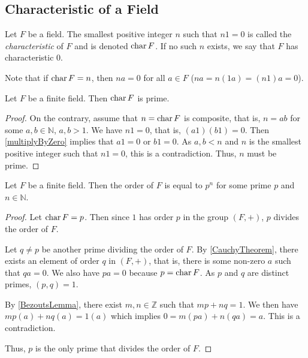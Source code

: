 \subsection{Characteristic of a Field}

\begin{definition}
    Let $F$ be a field. The smallest positive integer $n$ such that $n1=0$ is called the \textit{characteristic} of $F$ and is denoted $\operatorname{char} F$. If no such $n$ exists, we say that $F$ has characteristic $0$.
\end{definition}

Note that if $\operatorname{char} F=n$, then $na=0$ for all $a\in F$ ($na=n(1a)=(n1)a=0$).

\begin{theorem}
    Let $F$ be a finite field. Then $\operatorname{char} F$ is prime.
\end{theorem}
\begin{proof}
    On the contrary, assume that $n=\operatorname{char} F$ is composite, that is, $n=ab$ for some $a,b\in\mathbb{N}$, $a,b>1$. We have $n1=0$, that is, $(a1)(b1)=0$. Then \ref{multiplyByZero} implies that $a1=0$ or $b1=0$. As $a,b<n$ and $n$ is the smallest positive integer such that $n1=0$, this is a contradiction. Thus, $n$ must be prime.
\end{proof}

\begin{theorem}
    Let $F$ be a finite field. Then the order of $F$ is equal to $p^n$ for some prime $p$ and $n\in\mathbb{N}$.
\end{theorem}
\begin{proof}
    Let $\operatorname{char} F=p$. Then since $1$ has order $p$ in the group $(F,+)$, $p$ divides the order of $F$.
    
    \vspace{1mm}
    Let $q\neq p$ be another prime dividing the order of $F$. By \ref{CauchyTheorem}, there exists an element of order $q$ in $(F,+)$, that is, there is some non-zero $a$ such that $qa=0$. We also have $pa=0$ because $p = \operatorname{char} F$. As $p$ and $q$ are distinct primes, $(p,q)=1$.
    
    \vspace{1mm}
    By \ref{BezoutsLemma}, there exist $m,n\in\mathbb{Z}$ such that $mp+nq=1$. We then have $mp(a)+nq(a)=1(a)$ which implies $0=m(pa)+n(qa)=a$. This is a contradiction.
    
    \vspace{1mm}
    Thus, $p$ is the only prime that divides the order of $F$.
\end{proof}

